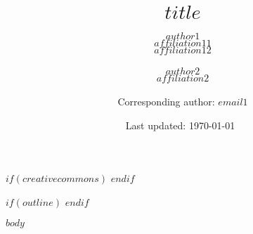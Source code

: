 \documentclass[$fontsize$]{article}
\author{
  $author1$\\$affiliation11$\\$affiliation12$\\
  \smallskip\\
  $author2$\\$affiliation2$\\
  \smallskip\\
  Corresponding author: $email1$
}
\title{$title$}
\date{Last updated: \today\ \currenttime}
\begin{document}
\maketitle

$if(creativecommons)$
\doclicenseThis
$endif$

\thispagestyle{empty}
$if(outline)$
\tableofcontents
$endif$
\setcounter{page}{0}
\clearpage

\afterpage{\setlength\parskip{10pt}}

$body$

\end{document}
